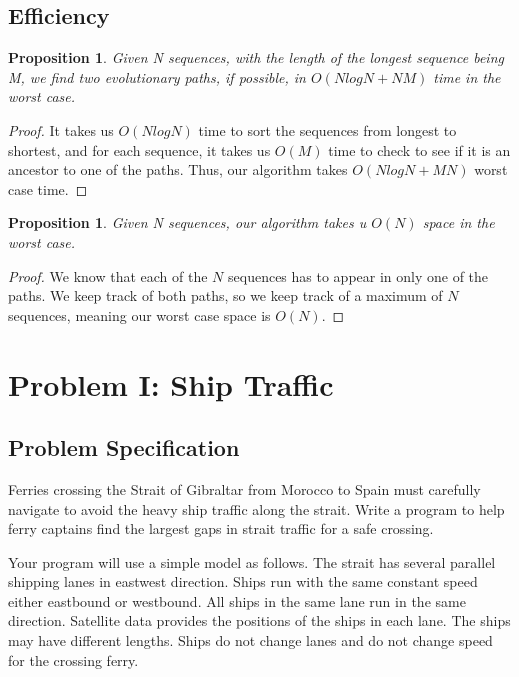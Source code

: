 \documentclass[12pt]{article}
\newtheorem{proposition}[theorem]{Proposition}
\begin{document}
\subsection{Efficiency}

\begin{proposition}
    Given N sequences, with the length of the longest
    sequence being M, we find two evolutionary paths,
    if possible, in $O(NlogN + NM)$ time in the worst
    case.
\end{proposition}

\begin{proof}
    It takes us $O(NlogN)$ time to sort the sequences
    from longest to shortest, and for each sequence,
    it takes us $O(M)$ time to check to see if it is
    an ancestor to one of the paths. Thus, our algorithm
    takes $O(NlogN + MN)$ worst case time.
\end{proof}

\begin{proposition}
    Given N sequences, our algorithm takes u $O(N)$
    space in the worst case.
\end{proposition}

\begin{proof}
    We know that each of the $N$ sequences has to
    appear in only one of the paths. We keep track of
    both paths, so we keep track of a maximum of
    $N$ sequences, meaning our worst case space is
    $O(N)$.
\end{proof}

\newpage

\section{Problem I: Ship Traffic}

\subsection{Problem Specification}

Ferries crossing the Strait of Gibraltar from Morocco
to Spain must carefully navigate to avoid the heavy ship
traffic along the strait. Write a program to help ferry
captains find the largest gaps in strait traffic for
a safe crossing.

Your program will use a simple model as follows. The strait
has several parallel shipping lanes in eastwest direction. Ships
run with the same constant speed either eastbound or westbound.
All ships in the same lane run in the same direction. Satellite
data provides the positions of the ships in each lane. The
ships may have different lengths. Ships do not change lanes and
do not change speed for the crossing ferry.
\end{document}
